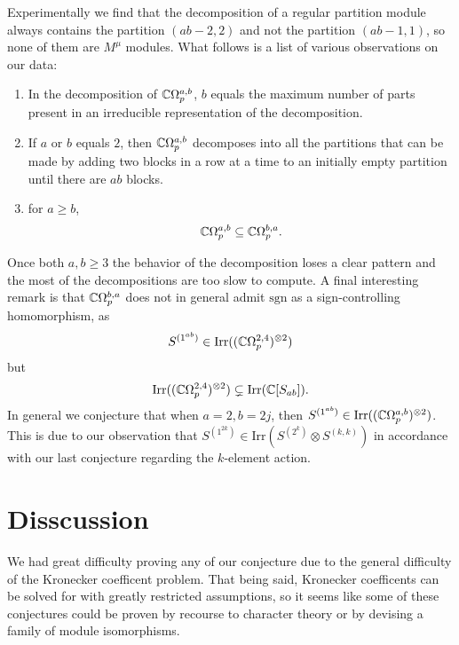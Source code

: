 \documentclass[12pt,twoside]{reedthesis}
\theoremstyle{plain}   %
\theoremstyle{definition}
\theoremstyle{remark}
\numberwithin{equation}{section}
\def\irr{\mathrm{Irr}}
\begin{document}
Experimentally we find that the decomposition of a regular partition module always contains the partition $(ab-2,2)$ and not the partition $(ab-1,1)$, so none of them are $M^\mu$ modules.
What follows is a list of various observations on our data:
\begin{enumerate}

\item In the decomposition of $\mathbb{C} \Omega_p^{a,b}$, $b$ equals the maximum number of parts present in an irreducible representation of the decomposition.
\item If $a$ or $b$ equals $2$, then $\mathbb{C} \Omega_p^{a,b}$ decomposes into all the partitions that can be made by adding two blocks in a row at a time to an initially empty partition until there are $ab$ blocks.
\item for $a \geq b$,
  \[ \mathbb{C} \Omega_p^{a,b} \subseteq \mathbb{C} \Omega_p^{b,a}.\]
\end{enumerate}
Once both $a,b \geq 3$ the behavior of the decomposition loses a clear pattern and the most of the decompositions are too slow to compute.
A final interesting remark is that $\mathbb{C} \Omega_p^{b,a}$ does not in general admit $\mathrm{sgn}$ as a sign-controlling homomorphism, as
\[S^{(1^{ab})} \in \irr((\CC \Omega_p^{2,4})^{\otimes 2})\] but \[ \irr((\CC \Omega_p^{2,4})^{\otimes 2}) \subsetneq \irr(\CC [S_{ab}]).\]
In general we conjecture that when $a=2, b= 2j$, then $S^{(1^{ab})} \in \irr((\CC \Omega_p^{a,b})^{\otimes 2})$. This is due to our observation that $S^{(1^{2k})} \in \irr(S^{(2^k)} \otimes S^{(k,k)})$ in accordance with
our last conjecture regarding the $k$-element action.

\chapter{Disscussion}
We had great difficulty proving any of our conjecture due to the general difficulty of the Kronecker coefficent problem.
That being said, Kronecker coefficents can be solved for with greatly restricted assumptions, so it seems like some of these conjectures could be proven by recourse to character theory
or by devising a family of module isomorphisms.
\end{document}
